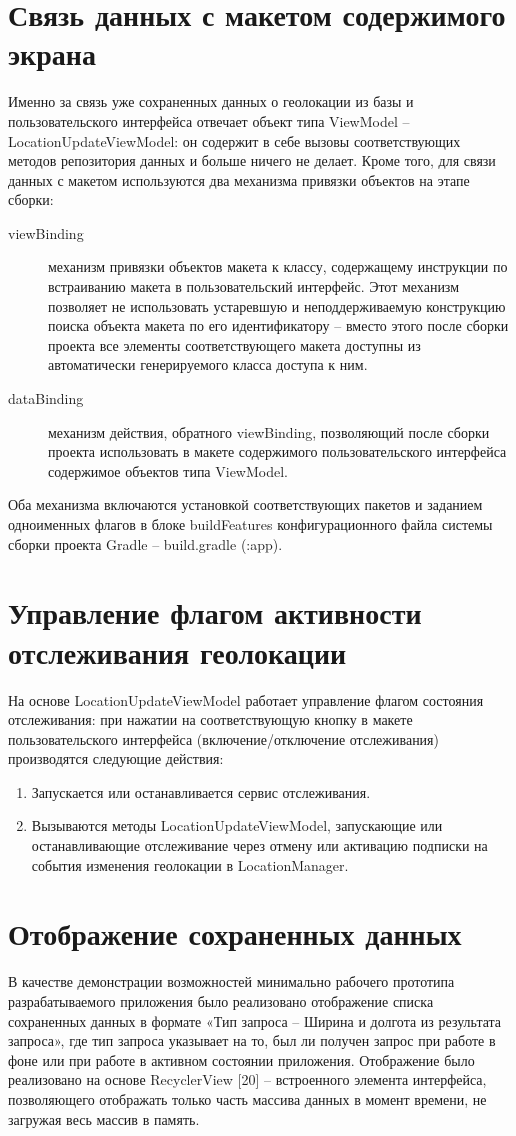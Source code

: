 \section{Связь данных с макетом содержимого экрана}
Именно за связь уже сохраненных данных о геолокации из базы и пользовательского интерфейса отвечает объект типа ViewModel – LocationUpdateViewModel: он содержит в себе вызовы соответствующих методов репозитория данных и больше ничего не делает.
Кроме того, для связи данных с макетом используются два механизма привязки объектов на этапе сборки:
\begin{description}
	\item[viewBinding] механизм привязки объектов макета к классу, содержащему инструкции по встраиванию макета в пользовательский интерфейс. Этот механизм позволяет не использовать устаревшую и неподдерживаемую конструкцию поиска объекта макета по его идентификатору – вместо этого после сборки проекта все элементы соответствующего макета доступны из автоматически генерируемого класса доступа к ним.
	\item[dataBinding] механизм действия, обратного viewBinding, позволяющий после сборки проекта использовать в макете содержимого пользовательского интерфейса содержимое объектов типа ViewModel.
\end{description}
Оба механизма включаются установкой соответствующих пакетов и заданием одноименных флагов в блоке buildFeatures конфигурационного файла системы сборки проекта Gradle – build.gradle (:app).


\section{Управление флагом активности отслеживания геолокации}
На основе LocationUpdateViewModel работает управление флагом состояния отслеживания: при нажатии на соответствующую кнопку в макете пользовательского интерфейса (включение/отключение отслеживания) производятся следующие действия:
\begin{enumerate}
	\item Запускается или останавливается сервис отслеживания.
	\item Вызываются методы LocationUpdateViewModel, запускающие или останавливающие отслеживание через отмену или активацию подписки на события изменения геолокации в LocationManager.
\end{enumerate}


\section{Отображение сохраненных данных}
В качестве демонстрации возможностей минимально рабочего прототипа разрабатываемого приложения было реализовано отображение списка сохраненных данных в формате «Тип запроса – Ширина и долгота из результата запроса», где тип запроса указывает на то, был ли получен запрос при работе в фоне или при работе в активном состоянии приложения.
Отображение было реализовано на основе RecyclerView [20] – встроенного элемента интерфейса, позволяющего отображать только часть массива данных в момент времени, не загружая весь массив в память.
